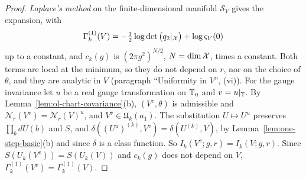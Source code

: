 \begin{proof}
\emph{Laplace's method} on the finite-dimensional manifold $\mathcal S_V$ gives the expansion, with
\[
\Gamma^{(1)}_k(V)=-\tfrac12\log\det\big(q_2|_{\mathcal X}\big)+\log\varsigma_V(0)
\]
up to a constant, and $c_k(g)$ is $(2\pi g^2)^{N/2}$, $N=\dim\mathcal X$, times a constant. Both terms are local at the minimum, so they do not depend on $r$, nor on the choice of $\theta$, and they are analytic in $V$ (paragraph ``Uniformity in $V$'', (vi)). For the gauge invariance let $u$ be a real gauge transformation on $\mathbb T_\eta$ and $v=u|_\mathbb T$. By Lemma~\ref{lem:ol-chart-covariance}(b), $(V^v,\theta)$ is admissible and $\mathscr N_r(V^v)=\mathscr N_r(V)^u$, and $V^v\in\mathfrak U_k(a_1)$. The substitution $U\mapsto U^u$ preserves $\prod_bdU(b)$ and $S$, and $\delta((U^u)^{(k)},V^v)=\delta(U^{(k)},V)$, by Lemma~\ref{lem:one-step-basic}(b) and since $\delta$ is a class function. So $I_k(V^v;g,r)=I_k(V;g,r)$. Since $S(U_k(V^v))=S(U_k(V))$ and $c_k(g)$ does not depend on $V$, $\Gamma^{(1)}_k(V^v)=\Gamma^{(1)}_k(V)$.


\end{proof}

